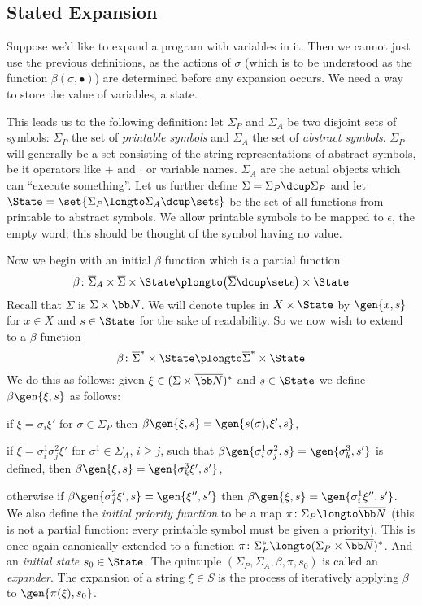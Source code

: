 \subsection{Stated Expansion}

Suppose we'd like to expand a program with variables in it.
Then we cannot just use the previous definitions, as the actions of $\sigma$ (which is to be understood as the function $\beta(\sigma,\bullet)$) are determined before any expansion occurs.
We need a way to store the value of variables, a state.

This leads us to the following definition: let $\Sigma_P$ and $\Sigma_A$ be two disjoint sets of symbols: $\Sigma_P$ the set of {\it printable symbols} and $\Sigma_A$ the set of {\it abstract symbols}.
$\Sigma_P$ will generally be a set consisting of the string representations of abstract symbols, be it operators like $+$ and $\cdot$ or variable names.
$\Sigma_A$ are the actual objects which can ``execute something''.
Let us further define $\Sigma=\Sigma_P\dcup\Sigma_P$ and let $\State=\set{\Sigma_P\longto\Sigma_A\dcup\set\epsilon}$ be the set of all functions from printable to abstract symbols.
We allow printable symbols to be mapped to $\epsilon$, the empty word; this should be thought of the symbol having no value.

Now we begin with an initial $\beta$ function which is a partial function
$$ \beta\colon\overline\Sigma_A\times\overline\Sigma\times\State \plongto \bigl(\overline\Sigma\dcup\set\epsilon\bigr)\times\State $$
Recall that $\overline\Sigma$ is $\Sigma\times{\bb N}$.
We will denote tuples in $X\times\State$ by $\gen{x,s}$ for $x\in X$ and $s\in\State$ for the sake of readability.
So we now wish to extend to a $\beta$ function
$$ \beta\colon\overline\Sigma^*\times\State \plongto \overline\Sigma^*\times\State $$
We do this as follows: given $\xi\in(\Sigma\times\overline{\bb N})^*$ and $s\in\State$ we define $\beta\gen{\xi,s}$ as follows:
\benum
    \item if $\xi=\sigma_i\xi'$ for $\sigma\in\Sigma_P$ then $\beta\gen{\xi,s}=\gen{s(\sigma)_i\xi',s}$,
    \item if $\xi=\sigma^1_i\sigma^2_j\xi'$ for $\sigma^1\in\Sigma_A$, $i\geq j$, such that $\beta\gen{\sigma^1_i\sigma^2_j,s}=\gen{\sigma^3_k,s'}$ is defined, then
        $\beta\gen{\xi,s}=\gen{\sigma^3_k\xi',s'}$,
    \item otherwise if $\beta\gen{\sigma^2_j\xi',s}=\gen{\xi'',s'}$ then $\beta\gen{\xi,s}=\gen{\sigma^1_i\xi'',s'}$.
\eenum
We also define the {\it initial priority function} to be a map $\pi\colon\Sigma_P\longto\overline{\bb N}$ (this is not a partial function: every printable symbol must be given a priority).
This is once again canonically extended to a function $\pi\colon\Sigma_P^*\longto(\Sigma_P\times\overline{\bb N})^*$.
And an {\it initial state} $s_0\in\State$.
The quintuple $(\Sigma_P,\Sigma_A,\beta,\pi,s_0)$ is called an {\it expander}.
The expansion of a string $\xi\in S$ is the process of iteratively applying $\beta$ to $\gen{\pi(\xi),s_0}$.

